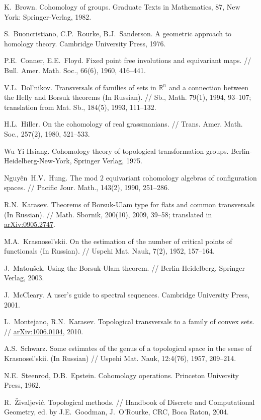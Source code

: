 \documentclass[12pt,a4paper]{amsart}
\theoremstyle{definition}
\theoremstyle{remark}
\begin{document}
\begin{thebibliography}{99}

K.~Brown. Cohomology of groups. Graduate Texts in Mathematics, 87, New York: Springer-Verlag, 1982.

S.~Buoncristiano, C.P.~Rourke, B.J.~Sanderson. A geometric approach to homology theory. Cambridge University Press, 1976.

P.E.~Conner, E.E.~Floyd. Fixed point free involutions and equivariant maps. // Bull. Amer. Math. Soc., 66(6), 1960, 416--441. 

V.L.~Dol'nikov. Transversals of families of sets in $\mathbb R^n$ and a connection between the Helly and Borsuk theorems (In Russian). // Sb., Math. 79(1), 1994, 93--107; translation from Mat. Sb., 184(5), 1993, 111--132.

H.L.~Hiller.  On the cohomology of real grassmanians. // Trans. Amer. Math. Soc., 257(2), 1980, 521--533.

Wu Yi Hsiang. Cohomology theory of topological transformation groups. Berlin-Heidelberg-New-York, Springer Verlag, 1975.

Nguy\^ en~H.V.~Hung. The mod $2$ equivariant cohomology algebras of configuration spaces. // Pacific Jour. Math., 143(2), 1990, 251--286.

R.N.~Karasev. Theorems of Borsuk-Ulam type for flats and common transversals (In Russian). // Math. Sbornik, 200(10), 2009, 39--58; translated in \href{http://arxiv.org/abs/0905.2747}{arXiv:0905.2747}.

M.A.~Krasnosel'skii. On the estimation of the number of critical points of functionals (In Russian). // Uspehi Mat. Nauk, 7(2), 1952, 157--164.

J.~Matou\v sek. Using the Borsuk-Ulam theorem. // Berlin-Heidelberg, Springer Verlag, 2003.

J.~McCleary. A user's guide to spectral sequences. Cambridge University Press, 2001.

L.~Montejano, R.N.~Karasev. Topological transversals to a family of convex sets. // \href{http://arxiv.org/abs/1006.0104}{arXiv:1006.0104}, 2010.

A.S.~Schwarz. Some estimates of the genus of a topological space in the sense of Krasnosel'skii. (In Russian) // Uspehi Mat. Nauk, 12:4(76), 1957, 209--214. 

N.E.~Steenrod, D.B.~Epstein. Cohomology operations. Princeton University Press, 1962.

R.~\v Zivaljevi\'c. Topological methods. // Handbook of Discrete and Computational Geometry, ed. by J.E.~Goodman, J.~O'Rourke, CRC, Boca Raton, 2004.

\end{thebibliography}
\end{document}
